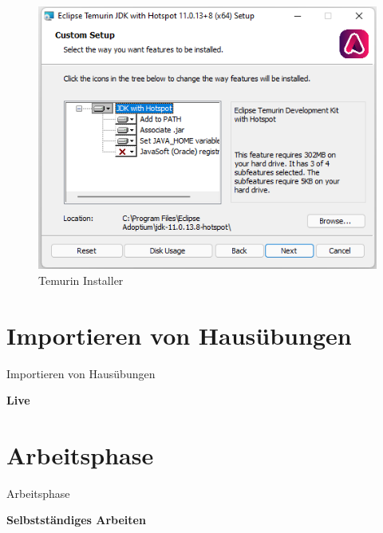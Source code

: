 \documentclass{../tuda-beamer}
\begin{document}
  \begin{frame}[c]
    \begin{figure}[h]
      \centering
      \includegraphics[width=.3\linewidth]{graphics/temurin_installer.png}
      \caption{Temurin Installer}
    \end{figure}
  \end{frame}


  \section{Importieren von Hausübungen}
  \begin{frame}[c]{Importieren von Hausübungen}
    \begin{center}
      \textbf{\LARGE Live}
    \end{center}
  \end{frame}


  \section{Arbeitsphase}
  \begin{frame}[c]{Arbeitsphase}
    \begin{center}
      \textbf{\LARGE Selbstständiges Arbeiten}
    \end{center}
  \end{frame}
\end{document}
